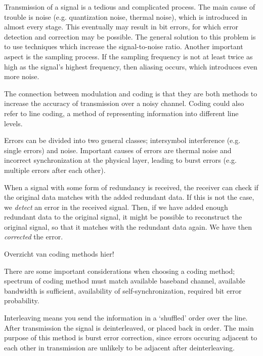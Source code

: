 \documentclass[11pt,titlepage]{report}
\begin{document}
Transmission of a signal is a tedious and complicated process. The main cause of trouble is noise (e.g. quantization noise, thermal noise), which is introduced in almost every stage. This eventually may result in bit errors, for which error detection and correction may be possible. The general solution to this problem is to use techniques which increase the signal-to-noise ratio. Another important aspect is the sampling process. If the sampling frequency is not at least twice as high as the signal's highest frequency, then aliasing occurs, which introduces even more noise.

The connection between modulation and coding is that they are both methods to increase the accuracy of transmission over a noisy channel. Coding could also refer to line coding, a method of representing information into different line levels.

Errors can be divided into two general classes; intersymbol interference (e.g. single errors) and noise. Important causes of errors are thermal noise and incorrect synchronization at the physical layer, leading to burst errors (e.g. multiple errors after each other).

When a signal with some form of redundancy is received, the receiver can check if the original data matches with the added redundant data. If this is not the case, we \emph{detect} an error in the received signal. Then, if we have added enough redundant data to the original signal, it might be possible to reconstruct the original signal, so that it matches with the redundant data again. We have then \emph{corrected} the error.

Overzicht van coding methods hier!

There are some important considerations when choosing a coding method; spectrum of coding method must match available baseband channel, available bandwidth is sufficient, availability of self-synchronization, required bit error probability.

Interleaving means you send the information in a `shuffled' order over the line. After transmission the signal is deinterleaved, or placed back in order. The main purpose of this method is burst error correction, since errors occuring adjacent to each other in transmission are unlikely to be adjacent after deinterleaving.
\end{document}
